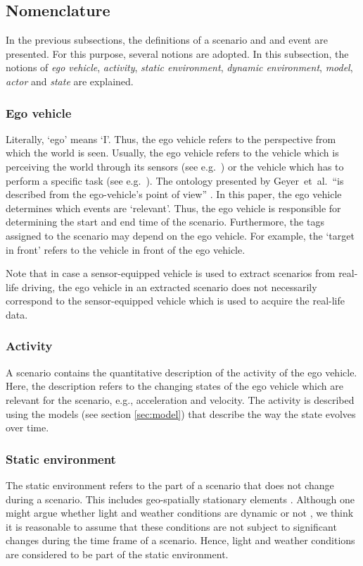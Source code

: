 \subsection{Nomenclature}
\label{sec:nomenclature}

In the previous subsections, the definitions of a scenario and and event are presented. For this purpose, several notions are adopted. In this subsection, the notions of \emph{ego vehicle}, \emph{activity}, \emph{static environment}, \emph{dynamic environment}, \emph{model}, \emph{actor} and \emph{state} are explained. 

\subsubsection{Ego vehicle}
\label{sec:ego vehicle}
Literally, `ego' means `I'. Thus, the ego vehicle refers to the perspective from which the world is seen. Usually, the ego vehicle refers to the vehicle which is perceiving the world through its sensors (see e.g.~\cite{Bonnin2014}) or the vehicle which has to perform a specific task (see e.g.~\cite{althoff2017CommonRoad}). The ontology presented by Geyer~et~al.\ ``is described from the ego-vehicle’s point of view'' \cite{geyer2014}. In this paper, the ego vehicle determines which events are `relevant'. Thus, the ego vehicle is responsible for determining the start and end time of the scenario. Furthermore, the tags assigned to the scenario may depend on the ego vehicle. For example, the `target in front' refers to the vehicle in front of the ego vehicle. 

Note that in case a sensor-equipped vehicle is used to extract scenarios from real-life driving, the ego vehicle in an extracted scenario does not necessarily correspond to the sensor-equipped vehicle which is used to acquire the real-life data.

\subsubsection{Activity}
\label{sec:activity}
A scenario contains the quantitative description of the activity of the ego vehicle. Here, the description refers to the changing states of the ego vehicle which are relevant for the scenario, e.g., acceleration and velocity. The activity is described using the models (see section \ref{sec:model}) that describe the way the state evolves over time.

\subsubsection{Static environment}
\label{sec:static environment}
The static environment refers to the part of a scenario that does not change during a scenario. This includes geo-spatially stationary elements \cite{ulbrich2015}. Although one might argue whether light and weather conditions are dynamic or not \cite{geyer2014,bach2016modelbased}, we think it is reasonable to assume that these conditions are not subject to significant changes during the time frame of a scenario. Hence, light and weather conditions are considered to be part of the static environment.

